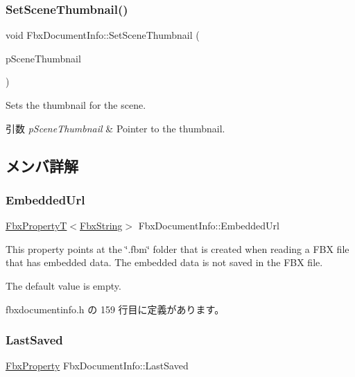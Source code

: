 \subsubsection{\texorpdfstring{Set\+Scene\+Thumbnail()}{SetSceneThumbnail()}}
{\footnotesize\ttfamily void Fbx\+Document\+Info\+::\+Set\+Scene\+Thumbnail (\begin{DoxyParamCaption}\item[{\hyperlink{class_fbx_thumbnail}{Fbx\+Thumbnail} $\ast$}]{p\+Scene\+Thumbnail }\end{DoxyParamCaption})}

Sets the thumbnail for the scene. 
\begin{DoxyParams}{引数}
{\em p\+Scene\+Thumbnail} & Pointer to the thumbnail. \\
\hline
\end{DoxyParams}


\subsection{メンバ詳解}
\mbox{\label{class_fbx_document_info_a650c0d0532a87408ccea6607a2c437bf}} 
\subsubsection{\texorpdfstring{Embedded\+Url}{EmbeddedUrl}}
{\footnotesize\ttfamily \hyperlink{class_fbx_property_t}{Fbx\+PropertyT}$<$\hyperlink{class_fbx_string}{Fbx\+String}$>$ Fbx\+Document\+Info\+::\+Embedded\+Url}

This property points at the \char`\"{}.\+fbm\char`\"{} folder that is created when reading a F\+BX file that has embedded data. The embedded data is not saved in the F\+BX file.

The default value is empty. 

 fbxdocumentinfo.\+h の 159 行目に定義があります。

\mbox{\label{class_fbx_document_info_a1f7b1001a8791ee8fc9f9655c543c84e}} 
\subsubsection{\texorpdfstring{Last\+Saved}{LastSaved}}
{\footnotesize\ttfamily \hyperlink{class_fbx_property}{Fbx\+Property} Fbx\+Document\+Info\+::\+Last\+Saved}


